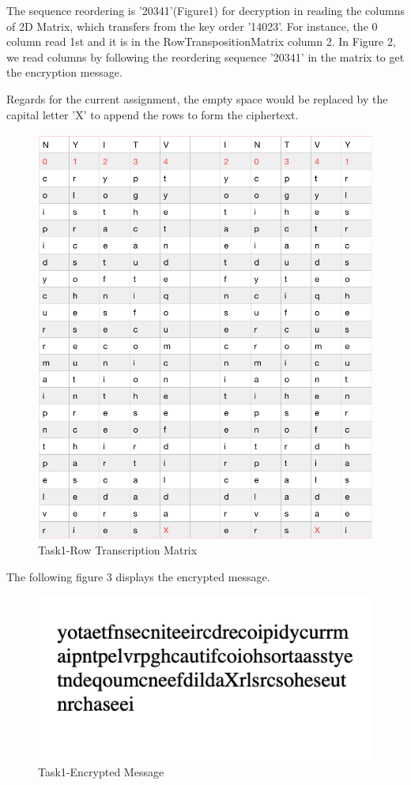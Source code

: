 \documentclass[twoside,twocolumn]{article}
\begin{document}
The sequence reordering is '20341'(Figure1) for decryption in reading the columns of 2D Matrix, which transfers from the key order '14023'. For instance, the 0 column read 1st and it is in the RowTranspositionMatrix column 2. In Figure 2, we read columns by following the reordering sequence '20341' in the matrix to get the encryption message.


Regards for the current assignment, the empty space would be replaced by the capital letter 'X' to append the rows to form the ciphertext.\\

\begin{figure}[H]
  \centering
  \includegraphics[scale=0.4]{./Graphs/Figure1.2.png}
  \caption{Task1-Row Transcription Matrix}
  \label{fig:testfig1}
\end{figure}


The following figure 3 displays the encrypted message.

\begin{figure}[H]
  \centering
  \includegraphics[scale=0.75]{./Graphs/Figure1.4.png}
  \caption{Task1-Encrypted Message}
  \label{fig:testfig1}
\end{figure}
\end{document}
